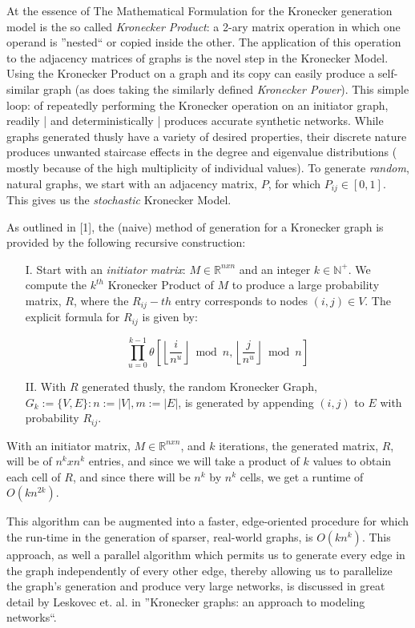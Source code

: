 \documentclass{article}
\begin{document}
At the essence of The Mathematical Formulation for the Kronecker generation model is the so called \textit{Kronecker Product}: a 2-ary matrix operation in which one operand is ''nested`` or copied inside the other. The application of this operation to the adjacency matrices of graphs is the novel step in the Kronecker Model. Using the Kronecker Product on a graph and its copy can easily produce a self-similar graph (as does taking the similarly defined \textit{Kronecker Power}). This simple loop: of repeatedly performing the Kronecker operation on an initiator graph, readily | and deterministically | produces accurate synthetic networks. While graphs generated thusly have a variety of desired properties, their discrete nature produces unwanted staircase effects in the degree and eigenvalue distributions ( mostly because of the high multiplicity of individual values). To generate \textit{random}, natural graphs, we start with an adjacency matrix, $P$, for which $P_{ij} \in [0,1]$. This gives us the \textit{stochastic} Kronecker Model. 

As outlined in [1], the (naive) method of generation for a Kronecker graph is provided by the following recursive construction: 

\begin{itemize}    
\item[I.] Start with an \textit{initiator matrix}: $M \in \mathbb{R}^{nxn}$ and an integer $k \in \mathbb{N}^+$. We compute the $k^{th}$ Kronecker Product of $M$ to produce a large probability matrix, $R$, where the  $R_{ij}-th$ entry corresponds to nodes $(i,j) \in V$. The explicit formula for $R_{ij}$ is given by:

$$
\prod_{u=0}^{k-1} \theta\left[\left\lfloor \frac{i}{n^u}\right\rfloor \bmod{n},
    \left\lfloor \frac{j}{n^u}\right\rfloor \bmod{n} \right]
$$

\item[II.] With $R$ generated thusly, the random Kronecker Graph, $G_k := \{V, E\} : n := |V|, m := |E|$, is generated by appending $(i,j)$ to $E$ with probability $R_{ij}$. 

\end{itemize}

\noindent
With an initiator matrix, $M \in \mathbb{R}^{nxn}$, and $k$ iterations, the generated matrix, $R$, will be of $n^kxn^k$ entries, and since we will take a product of $k$ values to obtain each cell of $R$, and since there will be $n^k$ by $n^k$ cells, we get a runtime of $O(kn^{2k})$. 

This algorithm can be augmented into a faster, edge-oriented procedure for which the run-time in the generation of sparser, real-world graphs, is $O(kn^k)$. This approach, as well a parallel algorithm which permits us to generate every edge in the graph independently of every other edge, thereby allowing us to parallelize the graph's generation and produce very large networks, is discussed in great detail by Leskovec et. al. in ''Kronecker graphs: an approach to modeling networks``.
\end{document}
